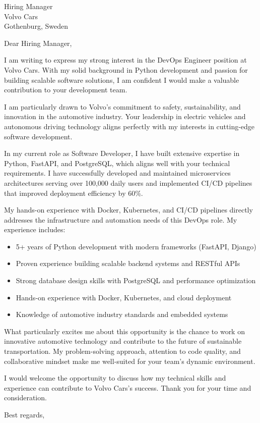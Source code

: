 \documentclass[11pt,a4paper]{letter}
\begin{document}
\begin{letter}{Hiring Manager \\ Volvo Cars \\ Gothenburg, Sweden}

\opening{Dear Hiring Manager,}

I am writing to express my strong interest in the DevOps Engineer position at Volvo Cars. With my solid background in Python development and passion for building scalable software solutions, I am confident I would make a valuable contribution to your development team.

I am particularly drawn to Volvo's commitment to safety, sustainability, and innovation in the automotive industry. Your leadership in electric vehicles and autonomous driving technology aligns perfectly with my interests in cutting-edge software development.

In my current role as Software Developer, I have built extensive expertise in Python, FastAPI, and PostgreSQL, which aligns well with your technical requirements. I have successfully developed and maintained microservices architectures serving over 100,000 daily users and implemented CI/CD pipelines that improved deployment efficiency by 60\%.

My hands-on experience with Docker, Kubernetes, and CI/CD pipelines directly addresses the infrastructure and automation needs of this DevOps role. My experience includes:

\begin{itemize}
\item 5+ years of Python development with modern frameworks (FastAPI, Django)
\item Proven experience building scalable backend systems and RESTful APIs
\item Strong database design skills with PostgreSQL and performance optimization
\item Hands-on experience with Docker, Kubernetes, and cloud deployment
\item Knowledge of automotive industry standards and embedded systems
\end{itemize}

What particularly excites me about this opportunity is the chance to work on innovative automotive technology and contribute to the future of sustainable transportation. My problem-solving approach, attention to code quality, and collaborative mindset make me well-suited for your team's dynamic environment.

I would welcome the opportunity to discuss how my technical skills and experience can contribute to Volvo Cars's success. Thank you for your time and consideration.

\closing{Best regards,}

\end{letter}
\end{document}
